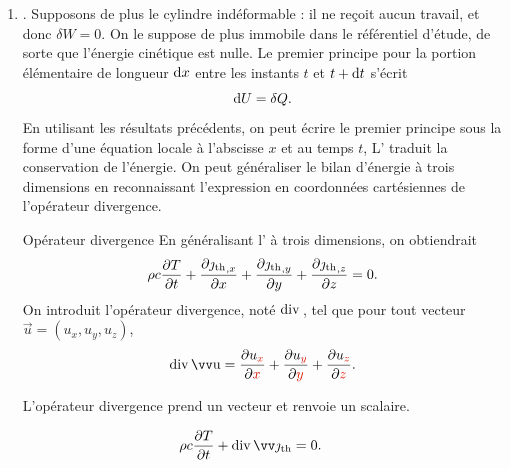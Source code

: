 \documentclass[12pt,fancy]{cours}
\begin{document}
\begin{enumerate}
\item {}.
Supposons de plus le cylindre indéformable : il ne reçoit aucun travail, et donc $\delta W=0$. On le suppose de plus immobile dans le référentiel d’étude, de sorte que l’énergie cinétique est nulle. Le premier principe pour la portion élémentaire de longueur $\mathrm{d} x$ entre les instants $t$ et $t+\mathrm{d} t$ s'écrit
\begin{equation}
\mathrm{d} U=\delta Q.
\end{equation}
En utilisant les résultats précédents, on peut écrire le premier principe sous la forme d’une équation locale à l’abscisse $x$ et au temps $t$,
L’ traduit la conservation de l'énergie. On peut généraliser le bilan d'énergie à trois dimensions en reconnaissant l'expression en coordonnées cartésiennes de l'opérateur divergence.
\begin{rappel}{Opérateur divergence}
En généralisant l' à trois dimensions, on obtiendrait
\begin{equation}
\rho c \dfrac{\partial T}{\partial t}+\frac{\partial {\jmath_{\rm th}}_{,x}}{\partial x} + \frac{\partial {\jmath_{\rm th}}_{,y}}{\partial y} + \frac{\partial {\jmath_{\rm th}}_{,z}}{\partial z} =0.
\end{equation}
On introduit l'opérateur divergence, noté ${\rm {div}\,{{}}}$, tel que pour tout vecteur $\Vec{u} = (u_x,u_y,u_z)$,
\begin{equation}
\Dive{\Vec{u}} = \dr{u_{\JRouge{x}}}{\JRouge{x}} + \dr{u_{\JRouge{y}}}{\JRouge{y}} + \dr{u_{\JRouge{z}}}{\JRouge{z}}.
\end{equation}
\begin{danger}
  L'opérateur divergence prend un vecteur et renvoie un scalaire.
\end{danger}
\end{rappel}

\end{enumerate}

\begin{theorem}\label{form:bilan_premier_principe_3D}
\begin{equation*}
\rho c\frac{\partial T}{\partial t}+\Dive{\Vec{\jth}}=0.
\end{equation*}
\end{theorem}
\end{document}
